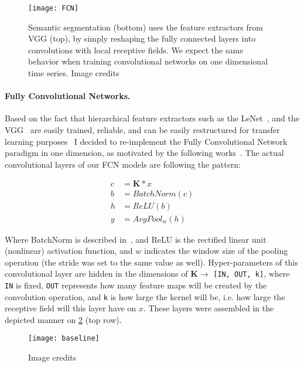 \begin{figure}
  \centering
  \texttt{[image: FCN]}\label{fig:FCN}
  \caption{Semantic segmentation (bottom) uses the feature extractors from VGG (top), by simply reshaping the fully connected layers into convolutions with local receptive fields. We expect the same behavior when training convolutional networks on one dimensional time series. Image credits~\cite{Long_2015_CVPR}}
\end{figure}

\paragraph{Fully Convolutional Networks.}
Based on the fact that hierarchical feature extractors such as the LeNet~\cite{lecun1995convolutional}, and the VGG~\cite{VGG} are easily trained, reliable, and can be easily restructured for transfer learning purposes~\cite{transfer learning} I decided to re-implement the Fully Convolutional Network~\cite{Long_2015_CVPR} paradigm in one dimension, as motivated by the following works~\cite{mittelman2015time, langkvist2014review}.
The actual convolutional layers of our FCN models are following the pattern:
\begin{center}
  \begin{equation}\label{eq:conv}
    \begin{split}
      c &= \mathbf{K} \ast x\\
      b &= BatchNorm(c)\\
      h &= ReLU(b)\\
      y &= AvgPool_w(h)
    \end{split}
  \end{equation}
\end{center}

Where BatchNorm is described in~\cite{batchnorm}, and ReLU is the rectified linear unit (nonlinear) activation function, and $w$ indicates the window size of the pooling operation (the stride was set to the same value as well).
Hyper-parameters of this convolutional layer are hidden in the dimensions of  $\mathbf{K}\rightarrow$ \texttt{[IN, OUT, k]}, where \texttt{IN} is fixed, \texttt{OUT} represents how many feature maps will be created by the convolution operation, and \texttt{k} is how large the kernel will be, i.e. how large the receptive field will this layer have on $x$.
These layers were assembled in the depicted manner on \ref{fig:baseline} (top row).

\begin{figure}
  \centering
  \texttt{[image: baseline]}\label{fig:baseline}
  \caption{Image credits~\cite{wang2016time}}
\end{figure}

